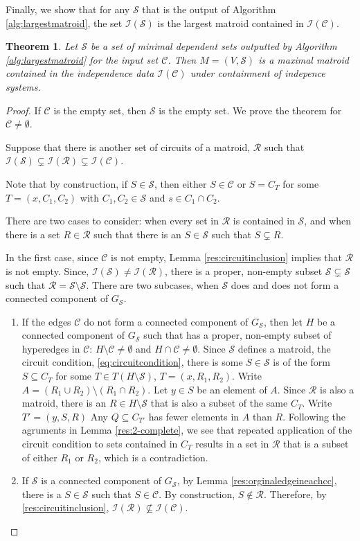 \documentclass[11pt]{article}
\newcommand{\sI}{\mathscr{I}}
\newcommand{\sC}{\mathscr{C}}
\newcommand{\cS}{\mathcal{S}}
\newcommand{\sR}{\mathscr{R}}
\newcommand{\sS}{\mathscr{S}}
\newtheorem{thm}{Theorem}[section]
\theoremstyle{remark}
\theoremstyle{definition}
\begin{document}
Finally, we show that for any $\sS$ that is the output of Algorithm \ref{alg:largestmatroid}, the set $\sI(\sS)$ is the largest matroid contained in $\sI(\sC)$.  

\begin{thm}
    Let $\sS$ be a set of minimal dependent sets outputted by Algorithm \ref{alg:largestmatroid} for the input set $\sC$. Then $M = (V, \sS)$ is a maximal matroid contained in the independence data $\sI(\sC)$ under containment of indepence systems. 
\end{thm}
\begin{proof}
    If $\sC$ is the empty set, then $\sS$ is the empty set. We prove the theorem for $\sC \neq \emptyset$.
    
    Suppose that there is another set of circuits of a matroid, $\sR$ such that $\sI(\sS) \subsetneq \sI(\sR) \subsetneq \sI(\sC)$. 

    Note that by construction, if $S \in \sS$, then either $S \in \sC$ or $S = C_T$ for some $T = (x, C_1, C_2)$ with $C_1, C_2 \in \sS$ and $s \in C_1 \cap C_2$.

    There are two cases to consider: when every set in $\sR$ is contained in $\sS$, and when there is a set $R \in \sR$ such that there is an $S \in \sS$ such that $S \subsetneq R$.

    In the first case, since $\sC$ is not empty, Lemma \ref{res:circuitinclusion} implies that $\sR$ is not empty. Since, $\sI(\sS) \neq \sI(\sR)$, there is a proper, non-empty subset $\cS \subsetneq \sS$ such that $\sR = \sS \setminus \cS$. There are two subcases, when $\cS$ does and does not form a connected component of $G_\sS$. 
    \begin{enumerate}
        \item If the edges $\sC$ do not form a connected component of $G_\sS$, then let $H$ be a connected component of $G_\sS$ such that has a proper, non-empty subset of hyperedges in $\sC$: $H \setminus \sC \neq \emptyset$ and $H \cap \sC \neq \emptyset$. Since $\sS$ defines a matroid, the circuit condition, \eqref{eq:circuitcondition}, there is some $S \in \cS$ is of the form $S \subseteq C_T$ for some $T \in T(H\setminus \cS)$, $T = (x, R_1, R_2)$.  Write $A  = (R_1 \cup R_2) \setminus (R_1 \cap R_2)$. Let $y \in S$ be an element of $A$. Since $\sR$ is also a matroid, there is an $R \in H\setminus \cS$ that is also a subset of the same $C_T$. Write $T' = (y, S, R)$ Any $Q \subseteq C_{T'}$ has fewer elements in $A$ than $R$. Following the agruments in Lemma \ref{res:2-complete}, we see that repeated application of the circuit condition to sets contained in $C_T$ results in a set in $\sR$ that is a subset of either $R_1$ or $R_2$, which is a contradiction.
        \item If $\cS$ is a connected component of $G_\sS$, by Lemma \ref{res:orginaledgeineachcc}, there is a $S \in \cS$ such that $S \in \sC$. By construction, $S \not \in \sR$. Therefore, by \ref{res:circuitinclusion}, $\sI(\sR) \not \subseteq \sI(\sC)$. \end{enumerate}
    

\end{proof}
\end{document}
